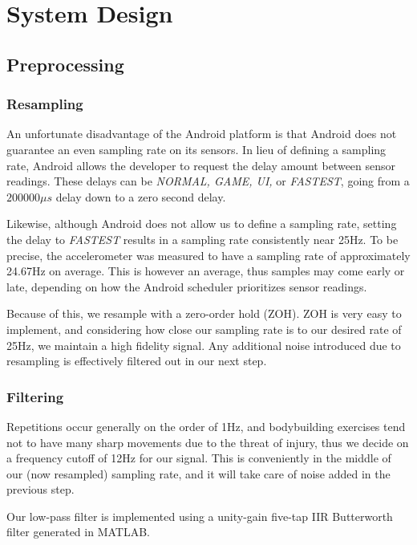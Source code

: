 \chapter{System Design}

\section{Preprocessing}

\subsection{Resampling}
An unfortunate disadvantage of the Android platform is that Android does not guarantee an even sampling rate on its sensors. In lieu of defining a sampling rate, Android allows the developer to request the delay amount between sensor readings. These delays can be \textit{NORMAL, GAME, UI,} or \textit{FASTEST}, going from a $200000\mu s$ delay down to a zero second delay.

Likewise, although Android does not allow us to define a sampling rate, setting the delay to \textit{FASTEST} results in a sampling rate consistently near 25Hz. To be precise, the accelerometer was measured to have a sampling rate of approximately 24.67Hz on average. This is however an average, thus samples may come early or late, depending on how the Android scheduler prioritizes sensor readings. 

Because of this, we resample with a zero-order hold (ZOH). ZOH is very easy to implement, and considering how close our sampling rate is to our desired rate of 25Hz, we maintain a high fidelity signal. Any additional noise introduced due to resampling is effectively filtered out in our next step.

\subsection{Filtering}
Repetitions occur generally on the order of 1Hz, and bodybuilding exercises tend not to have many sharp movements due to the threat of injury, thus we decide on a frequency cutoff of 12Hz for our signal. This is conveniently in the middle of our (now resampled) sampling rate, and it will take care of noise added in the previous step.

Our low-pass filter is implemented using a unity-gain five-tap IIR Butterworth filter generated in MATLAB.



